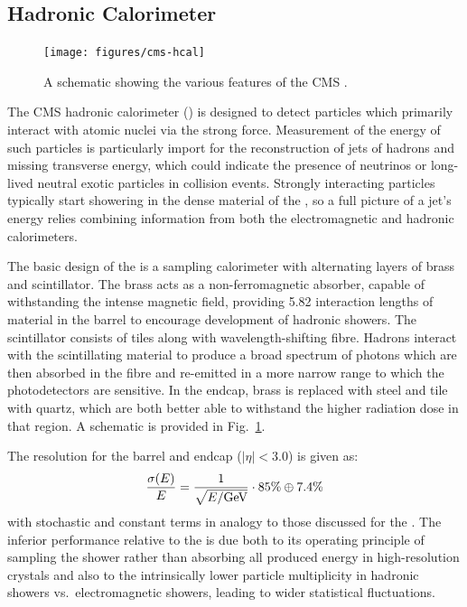 \subsection{Hadronic Calorimeter}

\begin{figure}
  \centering
  \texttt{[image: figures/cms-hcal]}
  \caption{A schematic showing the various features of the CMS \hcal.}
  \label{fig:cms-hcal}
\end{figure}

The CMS hadronic calorimeter (\hcal) is designed to detect particles which primarily interact with atomic nuclei via the strong force.  Measurement of the energy of such particles is particularly import for the reconstruction of jets of hadrons and missing transverse energy, which could indicate the presence of neutrinos or long-lived neutral exotic particles in collision events.  Strongly interacting particles typically start showering in the dense material of the \ecal{}, so a full picture of a jet's energy relies combining information from both the electromagnetic and hadronic calorimeters.  

The basic design of the \hcal is a sampling calorimeter with alternating layers of brass and scintillator.  The brass acts as a non-ferromagnetic absorber, capable of withstanding the intense magnetic field, providing \num{5.82} interaction lengths of material in the barrel to encourage development of hadronic showers.  The scintillator consists of tiles along with wavelength-shifting fibre.  Hadrons interact with the scintillating material to produce a broad spectrum of photons which are then absorbed in the fibre and re-emitted in a more narrow range to which the photodetectors are sensitive.  In the endcap, brass is replaced with steel and tile with quartz, which are both better able to withstand the higher radiation dose in that region.  A schematic is provided in Fig.~\ref{fig:cms-hcal}.

The resolution for the barrel and endcap \hcal ($|\eta| < 3.0$) is given as:
\begin{equation}
  \frac{\sigma(E)}{E} = \frac{1}{\sqrt{E/\text{Ge\hspace{-.08em}V}}} \cdot 85\% \oplus 7.4\%
\end{equation}
with stochastic and constant terms in analogy to those discussed for the \ecal.  The inferior performance relative to the \ecal is due both to its operating principle of sampling the shower rather than absorbing all produced energy in high-resolution crystals and also to the intrinsically lower particle multiplicity in hadronic showers vs.\ electromagnetic showers, leading to wider statistical fluctuations.

